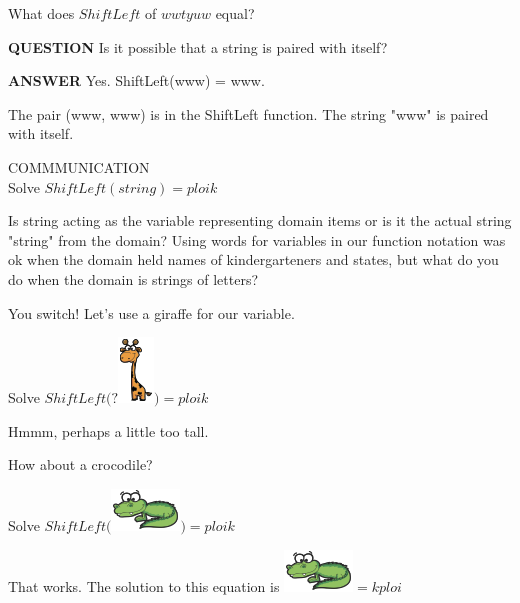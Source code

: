 \documentclass{ximera}
\begin{document}
\begin{question}
What does $ShiftLeft$ of $wwtyuw$ equal?
\begin{multipleChoice}
\end{multipleChoice}
\end{question}


\begin{dialogue}
\item[\textbf{QUESTION}] Is it possible that a string is paired with itself?

\item[\textbf{ANSWER}] Yes. ShiftLeft(www) = www.  
\end{dialogue}
The pair (www, www) is in the ShiftLeft function. The string "www" is paired with itself.
\quad \\







\begin{remark} COMMMUNICATION \\
Solve $ShiftLeft(string) = ploik$ 


Is string acting as the variable representing domain items or is it the actual string "string" from the domain? Using words for variables in our function notation was ok when the domain held names of kindergarteners and states, but what do you do when the domain is strings of letters?

You switch!  Let's use a giraffe for our variable.

Solve $ShiftLeft(?$\includegraphics{pics/giraffe.png}$) = ploik$

Hmmm, perhaps a little too tall.

How about a crocodile?

Solve $ShiftLeft($\includegraphics{pics/alligator.png}$) = ploik$

That works.  The solution to this equation is 
\includegraphics{pics/alligator.png}$ = kploi$

\end{remark}
\end{document}
